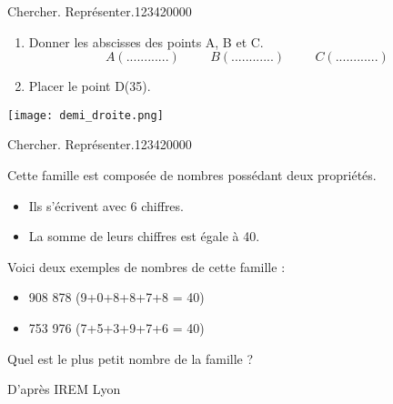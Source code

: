 \begin{pageParcourst}
\begin{ExoCt}{Chercher. Représenter.}{1234}{2}{0}{0}{0}{0}
 \begin{enumerate}[leftmargin=*]
 \item Donner les abscisses des points A, B et C.\\
 \[A(............)\hspace{1cm}B(............)\hspace{1cm}C(............)\]
 \item Placer le point D(35).
 \end{enumerate} 

 \begin{center}
     \texttt{[image: demi\_droite.png]}
 \end{center}
\end{ExoCt}
 
\begin{ExoCt}{Chercher. Représenter.}{1234}{2}{0}{0}{0}{0}
 
Cette famille est composée de nombres possédant deux propriétés.
\begin{itemize}
\item Ils s'écrivent avec 6 chiffres.
\item La somme de leurs chiffres est égale à 40.
\end{itemize}
Voici deux exemples de nombres de cette famille : 
\begin{itemize}
\item 908 878 (9+0+8+8+7+8 = 40)
\item 753 976 (7+5+3+9+7+6 = 40)
\end{itemize}
Quel est le plus petit nombre de la famille ? 

\hfill{\tiny D'après IREM Lyon}
\end{ExoCt}

\end{pageParcourst}


